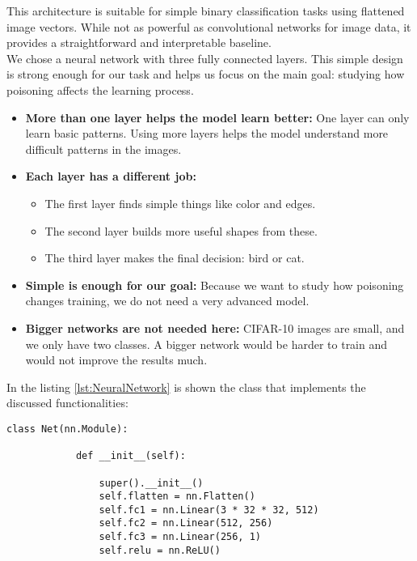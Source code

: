 This architecture is suitable for simple binary classification tasks using flattened image vectors. While not as powerful as convolutional networks for image data, it provides a straightforward and interpretable baseline.
\\We chose a neural network with three fully connected layers. This simple design is strong enough for our task and helps us focus on the main goal: studying how poisoning affects the learning process.




\begin{itemize}
    \item \textbf{More than one layer helps the model learn better:} One layer can only learn basic patterns. Using more layers helps the model understand more difficult patterns in the images.
    
    \item \textbf{Each layer has a different job:}
    \begin{itemize}
        \item The first layer finds simple things like color and edges.
        \item The second layer builds more useful shapes from these.
        \item The third layer makes the final decision: bird or cat.
    \end{itemize}
    
    \item \textbf{Simple is enough for our goal:} Because we want to study how poisoning changes training, we do not need a very advanced model.
    
    \item \textbf{Bigger networks are not needed here:} CIFAR-10 images are small, and we only have two classes. A bigger network would be harder to train and would not improve the results much.
\end{itemize}

In the listing \ref{lst:NeuralNetwork} is shown the class that implements the discussed functionalities:

\begin{minipage}{\linewidth}
    \begin{lstlisting}[caption=NeuralNetwork, label={lst:NeuralNetwork}]
        class Net(nn.Module):
        
            def __init__(self):
                
                super().__init__()
                self.flatten = nn.Flatten()
                self.fc1 = nn.Linear(3 * 32 * 32, 512)
                self.fc2 = nn.Linear(512, 256)
                self.fc3 = nn.Linear(256, 1)
                self.relu = nn.ReLU()
                
    \end{lstlisting}
\end{minipage}

